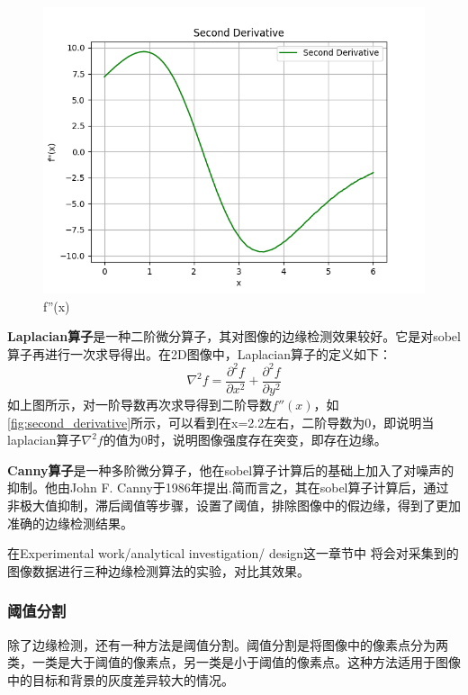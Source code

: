 \begin{figure}[htbp]
\begin{minipage}[b]{0.32\textwidth}
        \centering
        \includegraphics[width=\textwidth]{./fig/second_derivative.png}
        \caption{f''(x)}
        \label{fig:second_derivative}
    \end{minipage}
\end{figure}

\textbf{Laplacian算子}是一种二阶微分算子，其对图像的边缘检测效果较好。它是对sobel算子再进行一次求导得出。在2D图像中，Laplacian算子的定义如下：
\begin{equation}
    \nabla^2 f = \frac{\partial^2 f}{\partial x^2} + \frac{\partial^2 f}{\partial y^2}
\end{equation}
如上图所示，对一阶导数再次求导得到二阶导数$f''(x)$，如\autoref{fig:second_derivative}所示，可以看到在x=2.2左右，二阶导数为0，即说明当laplacian算子$\nabla^2 f$的值为0时，说明图像强度存在突变，即存在边缘。

\textbf{Canny算子}是一种多阶微分算子，他在sobel算子计算后的基础上加入了对噪声的抑制。他由John F. Canny于1986年提出\cite{3.2}.简而言之，其在sobel算子计算后，通过非极大值抑制，滞后阈值等步骤，设置了阈值，排除图像中的假边缘，得到了更加准确的边缘检测结果。

在Experimental work/analytical investigation/ design这一章节中 将会对采集到的图像数据进行三种边缘检测算法的实验，对比其效果。

\subsubsection{阈值分割}

除了边缘检测，还有一种方法是阈值分割。阈值分割是将图像中的像素点分为两类，一类是大于阈值的像素点，另一类是小于阈值的像素点。这种方法适用于图像中的目标和背景的灰度差异较大的情况。


